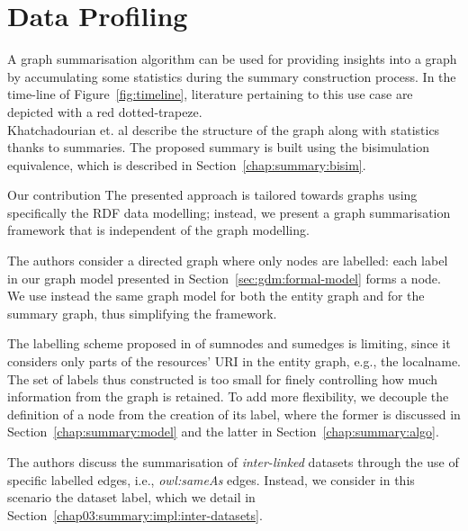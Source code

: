 
\section{Data Profiling}
\label{chap03:review:query-profiling}

A graph summarisation algorithm can be used for providing insights into a graph by accumulating some statistics during the summary construction process. In the time-line of Figure~\ref{fig:timeline}, literature pertaining to this use case are depicted with a red dotted-trapeze.\\

Khatchadourian et. al \cite{khatchadourian:2010:eswc} describe the structure of the graph along with statistics thanks to summaries. The proposed summary is built using the bisimulation equivalence, which is described in Section~\ref{chap:summary:bisim}.

\begin{centeremph}{Our contribution}
	The presented approach is tailored towards graphs using specifically the RDF data modelling; instead, we present a graph summarisation framework that is independent of the graph modelling.

	The authors consider a directed graph where only nodes are labelled: each label in our graph model presented in Section~\ref{sec:gdm:formal-model} forms a node. We use instead the same graph model for both the entity graph and for the summary graph, thus simplifying the framework.

	The labelling scheme proposed in \cite{khatchadourian:2010:eswc} of sumnodes and sumedges is limiting, since it considers only parts of the resources' URI in the entity graph, e.g., the localname. The set of labels thus constructed is too small for finely controlling how much information from the graph is retained. To add more flexibility, we decouple the definition of a node from the creation of its label, where the former is discussed in Section~\ref{chap:summary:model} and the latter in Section~\ref{chap:summary:algo}.

	The authors discuss the summarisation of \emph{inter-linked} datasets through the use of specific labelled edges, i.e., \emph{owl:sameAs} edges. Instead, we consider in this scenario the dataset label, which we detail in Section~\ref{chap03:summary:impl:inter-datasets}.
\end{centeremph}

